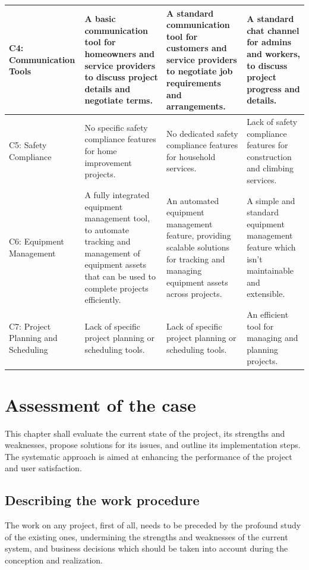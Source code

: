 \begin{longtable}{|p{2cm}|p{3.5cm}|p{3.5cm}|p{3.5cm}|}
    C4: Communication Tools & A basic communication tool for homeowners and service providers to discuss project details and negotiate terms. & A standard communication tool for customers and service providers to negotiate job requirements and arrangements. & A standard chat channel for admins and workers, to discuss project progress and details. \\
    \hline
    C5: Safety Compliance & No specific safety compliance features for home improvement projects. & No dedicated safety compliance features for household services. & Lack of safety compliance features for construction and climbing services. \\
    \hline
    C6: Equipment Management & A fully integrated equipment management tool, to automate tracking and  management of equipment assets that can be used to complete projects efficiently. & An automated equipment management feature, providing scalable solutions for tracking and managing equipment assets across projects. & A simple and standard equipment management feature which isn’t maintainable and extensible.\\
    \hline
    C7: Project Planning and Scheduling & Lack of specific project planning or scheduling tools. & Lack of specific project planning or scheduling tools. & An efficient tool for managing and planning projects. \\
    \hline
\end{longtable}

\section{Assessment of the case}
This chapter shall evaluate the current state of the project, its strengths and weaknesses, propose solutions for its issues, and outline its implementation steps. The systematic approach is aimed at enhancing the performance of the project and user satisfaction.

\subsection{Describing the work procedure}
The work on any project, first of all, needs to be preceded by the profound study of the existing ones, undermining the strengths and weaknesses of the current system, and business decisions which should be taken into account during the conception and realization.
